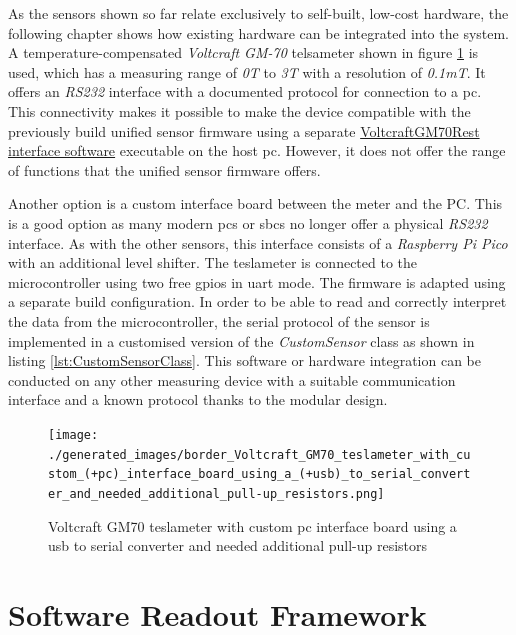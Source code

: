 As the sensors shown so far relate exclusively to self-built, low-cost
hardware, the following chapter shows how existing hardware can be
integrated into the system. A temperature-compensated \emph{Voltcraft
GM-70} telsameter shown in figure
\ref{Voltcraft_GM70_teslameter_with_custom_(+pc)_interface_board_using_a_(+usb)_to_serial_converter_and_needed_additional_pull-up_resistors.png}
is used, which has a measuring range of \emph{0T} to \emph{3T} with a
resolution of \emph{0.1mT}. It offers an \emph{RS232} interface with a
documented protocol for connection to a \gls{pc}. This connectivity
makes it possible to make the device compatible with the previously
build unified sensor firmware using a separate
\href{https://github.com/RBEGamer/VoltcraftGM70Rest}{VoltcraftGM70Rest interface software}
executable on the host \gls{pc}. However, it does not offer the range of
functions that the unified sensor firmware offers.

Another option is a custom interface board between the meter and the PC.
This is a good option as many modern \gls{pc}s or \gls{sbc}s no longer
offer a physical \emph{RS232} interface. As with the other sensors, this
interface consists of a \emph{Raspberry Pi Pico} with an additional
level shifter. The teslameter is connected to the microcontroller using
two free \gls{gpio}s in \gls{uart} mode. The firmware is adapted using a
separate build configuration. In order to be able to read and correctly
interpret the data from the microcontroller, the serial protocol of the
sensor is implemented in a customised version of the \emph{CustomSensor}
class as shown in listing \ref{lst:CustomSensorClass}. This software or
hardware integration can be conducted on any other measuring device with
a suitable communication interface and a known protocol thanks to the
modular design.

\begin{figure}
\centering
\texttt{[image: ./generated\_images/border\_Voltcraft\_GM70\_teslameter\_with\_custom\_(+pc)\_interface\_board\_using\_a\_(+usb)\_to\_serial\_converter\_and\_needed\_additional\_pull-up\_resistors.png]}
\caption{Voltcraft GM70 teslameter with custom \gls{pc} interface board
using a \gls{usb} to serial converter and needed additional pull-up
resistors
\label{Voltcraft_GM70_teslameter_with_custom_(+pc)_interface_board_using_a_(+usb)_to_serial_converter_and_needed_additional_pull-up_resistors.png}}
\end{figure}

\hypertarget{software-readout-framework}{%
\chapter{Software Readout Framework}\label{software-readout-framework}}

